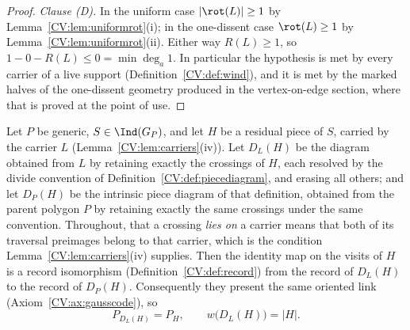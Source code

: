 \begin{proof}
\emph{Clause (D).} In the uniform case $|\rot(L)|\geq1$ by Lemma~\ref{CV:lem:uniformrot}(i); in the
one-dissent case $\rot(L)\geq1$ by Lemma~\ref{CV:lem:uniformrot}(ii). Either way
$R(L)\geq1$, so $1-0-R(L)\leq0=\min\deg_a1$. In particular the hypothesis is met by every carrier of a live support
(Definition~\ref{CV:def:wind}), and it is met by the marked halves of the
one-dissent geometry produced in the vertex-on-edge section, where that is
proved at the point of use.
\end{proof}

\begin{lemma}
\label{CV:lem:pieceintrinsic}\leanok
Let $P$ be generic, $S\in\Ind(G_P)$, and let $H$ be a residual piece of $S$,
carried by the carrier $L$ (Lemma~\ref{CV:lem:carriers}(iv)). Let $D_L(H)$ be the
diagram obtained from $L$ by retaining exactly the crossings of $H$, each
resolved by the divide convention of Definition~\ref{CV:def:piecediagram}, and
erasing all others; and let $D_P(H)$ be the intrinsic piece diagram of that
definition, obtained from the parent polygon $P$ by retaining exactly the same
crossings under the same convention. Throughout, that a crossing \emph{lies on}
a carrier means that both of its traversal preimages belong to that carrier,
which is the condition Lemma~\ref{CV:lem:carriers}(iv) supplies.
Then the identity map on the visits of $H$ is a record isomorphism
(Definition~\ref{CV:def:record}) from the record of $D_L(H)$ to the record of
$D_P(H)$. Consequently they present the same oriented link
(Axiom~\ref{CV:ax:gausscode}), so
\[
   P_{D_L(H)}=P_H,\qquad w\bigl(D_L(H)\bigr)=|H| .
\]
\end{lemma}
